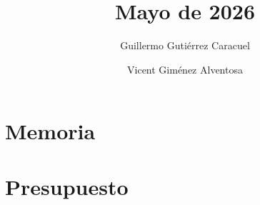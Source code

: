 \documentclass[tfg, rm, castellano]{tfgtfmetsii}
\title{
	\TFGtitulo\\[3ex]
	\mdseries\large	Mayo de 2026
	}
\author{
	Guillermo Gutiérrez Caracuel
	\and
	Vicent Giménez Alventosa
}
\begin{document}



\frontmatter





\cleardoublepage
{}
{}







\cleardoublepage
{}
{}

\tableofcontents


\mainmatter




\part{Memoria}










\part{Presupuesto}



\end{document}
